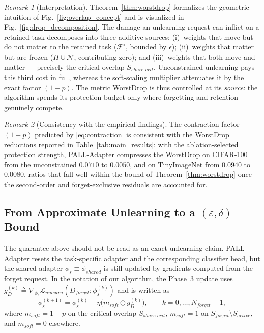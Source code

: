 \documentclass[conference]{IEEEtran}
\theoremstyle{plain}
\theoremstyle{definition}
\theoremstyle{remark}
\newtheorem{remark}{Remark}
\begin{document}
\begin{remark}[Interpretation]
\label{rem:interpretation}
Theorem~\ref{thm:worstdrop} formalizes the geometric intuition of
Fig.~\ref{fig:overlap_concept} and is visualized in
Fig.~\ref{fig:drop_decomposition}. The damage an unlearning request can
inflict on a retained task decomposes into three additive sources:
(i)~weights that move but do not matter to the retained task
($\mathcal{F}^{\!\circ}$, bounded by $\epsilon$); (ii)~weights that
matter but are frozen ($H\cup\mathcal{N}$, contributing zero); and
(iii)~weights that both move and matter --- precisely the critical
overlap $S_{share\_crit}$. Unconstrained unlearning pays this third
cost in full, whereas the soft-scaling multiplier attenuates it by the
exact factor $(1-p)$. The metric WorstDrop is thus controlled at its
\emph{source}: the algorithm spends its protection budget only where
forgetting and retention genuinely compete.
\end{remark}

\begin{remark}[Consistency with the empirical findings]
\label{rem:empirical}
The contraction factor $(1-p)$ predicted by \eqref{eq:contraction} is
consistent with the WorstDrop reductions reported in
Table~\ref{tab:main_results}: with the ablation-selected protection
strength, PALL-Adapter compresses the WorstDrop on CIFAR-100 from the
unconstrained $0.0710$ to $0.0050$, and on TinyImageNet from $0.0940$
to $0.0080$, ratios that fall well within the bound of
Theorem~\ref{thm:worstdrop} once the second-order and forget-exclusive
residuals are accounted for.
\end{remark}

\subsection{From Approximate Unlearning to a $(\varepsilon,\delta)$ Bound}
\label{subsec:approx-to-ed}

The guarantee above should not be read as an exact-unlearning claim.
PALL-Adapter resets the task-specific adapter and the corresponding
classifier head, but the shared adapter
$\phi_s\equiv\phi_{shared}$ is still updated by gradients computed
from the forget request. In the notation of our algorithm, the Phase~3
update uses
$g_D^{(k)}\triangleq
\nabla_{\phi_s}\mathcal{L}_{unlearn}(D_{forget};\phi_s^{(k)})$ and
is written as
\begin{equation}
\label{eq:privacy-update}
\phi_s^{(k+1)}
=
\phi_s^{(k)}
-\eta\big(m_{soft}\odot g_D^{(k)}\big),
\qquad
k=0,\ldots,N_{forget}-1,
\end{equation}
where $m_{soft}=1-p$ on the critical overlap
$S_{share\_crit}$, $m_{soft}=1$ on
$S_{forget}\setminus S_{active}$, and $m_{soft}=0$ elsewhere.
\end{document}
